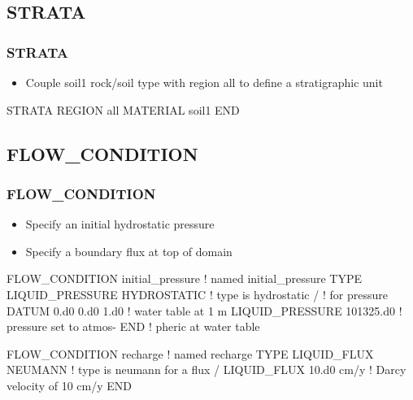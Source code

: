 \documentclass{beamer}
\newcommand\redcomment[1]{{{\color{red} #1}}}
\newcommand\bluecomment[1]{{{\color{blue} #1}}}
\newcommand\greencomment[1]{{{\color{green} #1}}}
\begin{document}
\subsection{STRATA}

\begin{frame}[fragile]\frametitle{STRATA}

\begin{itemize}
\item Couple \greencomment{soil1} rock/soil type with region \greencomment{all} to define a stratigraphic unit
\end{itemize}

\begin{semiverbatim}

STRATA
  REGION all
  MATERIAL soil1
END


\end{semiverbatim}

\end{frame}

\subsection{FLOW\_CONDITION}

\begin{frame}[fragile]\frametitle{FLOW\_CONDITION}

\begin{itemize}
\item Specify an initial hydrostatic pressure
\item Specify a boundary flux at top of domain
\end{itemize}

\begin{semiverbatim}
FLOW_CONDITION initial_pressure \bluecomment{! named \greencomment{initial_pressure}}
  TYPE
    LIQUID_PRESSURE HYDROSTATIC \bluecomment{! type is \redcomment{hydrostatic}}
  /                             \bluecomment{!   for pressure}
  DATUM 0.d0 0.d0 1.d0          \bluecomment{! water table at 1 m}
  LIQUID_PRESSURE 101325.d0     \bluecomment{! pressure set to atmos-}
END                             \bluecomment{!   pheric at water table}

FLOW_CONDITION recharge   \bluecomment{! named \greencomment{recharge}}
  TYPE
    LIQUID_FLUX NEUMANN   \bluecomment{! type is \redcomment{neumann} for a flux}
  /
  LIQUID_FLUX 10.d0 cm/y  \bluecomment{! Darcy velocity of 10 cm/y}
END
\end{semiverbatim}

\end{frame}
\end{document}
